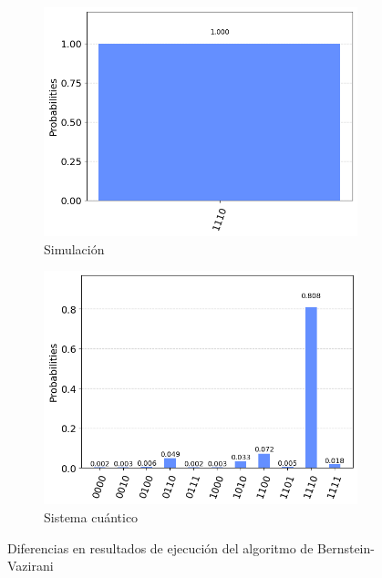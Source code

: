 \begin{figure}[H]
    \centering
    \begin{subfigure}[H]{0.45\textwidth}
        \centering
        \includegraphics[width=\textwidth]{TFG/imagenes/BV_simulación.png}
        \caption{Simulación}
        \label{sFig:Comp_a}
    \end{subfigure}
    \hfill
    \begin{subfigure}[H]{0.45\textwidth}
        \centering
        \includegraphics[width=\textwidth]{TFG/imagenes/BV_ruido.png}
        \caption{Sistema cuántico}
        \label{sFig:Comp_b}
    \end{subfigure}
        \caption{Diferencias en resultados de ejecución del algoritmo de Bernstein-Vazirani}
    \label{FIG:ComparacionRealSim}
 \end{figure}

